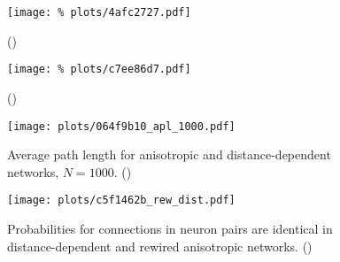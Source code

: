 \begin{figure}[H]
  \vspace{-1.2cm}
  \centering
  \texttt{[image: \%
    plots/4afc2727.pdf]}
  \captionsetup{skip=-7pt}
  \caption{\label{suppfig:rew_stats}()}

  \vspace{0.5cm}
  \captionsetup{skip=-1pt}
  \texttt{[image: \%
    plots/c7ee86d7.pdf]}
  \caption{\label{suppfig:out_degree}()}
  
  \vspace{0.5cm} 
  \texttt{[image: plots/064f9b10\_apl\_1000.pdf]}  
  \caption{\label{suppfig:small_world}Average path length for
    anisotropic and distance-dependent networks,
    $N=1000$. ()}

  \vspace{0.5cm}
 \captionsetup{skip=2pt}
  \texttt{[image: plots/c5f1462b\_rew\_dist.pdf]}
  \caption{\label{suppfig:two_neurons_dist_rew}Probabilities for
    connections in neuron pairs are identical in distance-dependent
    and rewired anisotropic networks. ()}

\end{figure}



